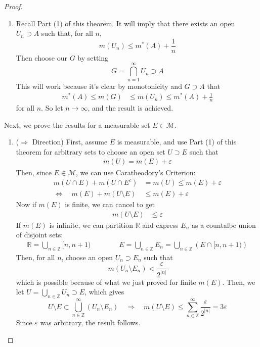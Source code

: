 \documentclass[12pt]{article}
\theoremstyle{plain}
\theoremstyle{definition}
\theoremstyle{remark}
\begin{document}
\begin{proof}
\begin{enumerate}
\item Recall Part (1) of this theorem. It will imply that there exists an open $U_n\supset A$ such that, for all $n$,
\[
    m(U_n) \leq m^*(A) + \frac{1}{n}
\]
Then choose our $G$ by setting
\[
    G = \bigcap^\infty_{n=1} U_n \supset A
\]
This will work because it's clear by monotonicity and $G\supset A$ that
\begin{align*}
    m^*(A) \leq m(G) &\leq m(U_n) 
    \leq m^*(A) + \frac{1}{n} 
\end{align*}
for all $n$. So let $n\rightarrow\infty$, and the result is achieved.
\end{enumerate}
Next, we prove the results for a measurable set $E\in\mathscr{M}$.
\begin{enumerate}
\item ($\Rightarrow$ Direction) First, assume $E$ is measurable, and use Part (1) of this theorem for arbitrary sets to choose an open set $U \supset E$ such that  
\begin{align*}
    m(U) = m(E) + \varepsilon
\end{align*}
Then, since $E\in\mathscr{M}$, we can use Caratheodory's Criterion:
\begin{align*}
    m(U\cap E) + m(U\cap E^c) &= m(U) \leq m(E) 
    +\varepsilon \\
    \Leftrightarrow  \quad
    m(E) + m(U\setminus E) &\leq m(E) +\varepsilon
\end{align*}
Now if $m(E)$ is finite, we can cancel to get 
\begin{align*}
    m(U\setminus E) &\leq \varepsilon
\end{align*}
If $m(E)$ is infinite, we can partition $\mathbb{R}$ and express $E_n$ as a countalbe union of disjoint sets:
\begin{align*}
    \mathbb{R} = \bigcup_{n\in\mathbb{Z}} [n,n+1)
    \qquad \qquad 
    E = \bigcup_{n\in\mathbb{Z}} E_n = 
    \bigcup_{n\in\mathbb{Z}} \left(E \cap [n,n+1)\right)
\end{align*}
Then, for all $n$, choose an open $U_n\supset E_n$ such that
\[
    m(U_n \setminus E_n) < \frac{\varepsilon}{2^{|n|}}
\]
which is possible because of what we just proved for finite $m(E)$. Then, we let $U = \bigcup_{n\in\mathbb{Z}} U_n \supset E$, which gives
\[
    U\setminus E \subset \bigcup^\infty_{n\in\mathbb{Z}}
    \left(U_n \setminus E_n \right)
    \quad \Rightarrow\quad
    m(U\setminus E) \leq \sum^\infty_{n\in\mathbb{Z}}
    \frac{\varepsilon}{2^{|n|}} = 3\varepsilon
\]
Since $\varepsilon$ was arbitrary, the result follows.

\end{enumerate}
\end{proof}
\end{document}
